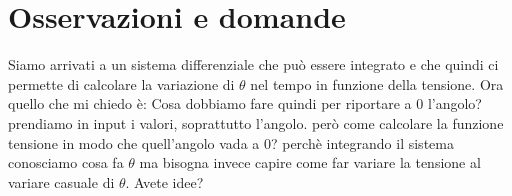 \documentclass[12pt,a4paper,twoside, openright]{scrartcl}
\begin{document}
\section{Osservazioni e domande}
	Siamo arrivati a un sistema differenziale che può essere integrato e che quindi ci permette di calcolare la variazione di $\theta$ nel tempo in funzione della tensione. Ora quello che mi chiedo è:
Cosa dobbiamo fare quindi per riportare a 0 l'angolo?  prendiamo in input i valori, soprattutto l'angolo. però come calcolare la funzione tensione in modo che quell'angolo vada a 0?
perchè integrando il sistema conosciamo cosa fa $\theta$ ma bisogna invece capire come far variare la tensione al variare casuale di $\theta$. Avete idee? 
\end{document}
